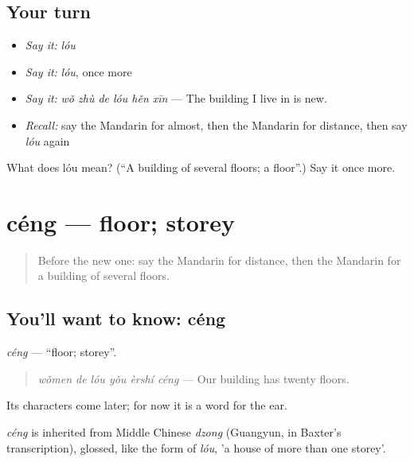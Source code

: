 \subsection*{Your turn}
\begin{itemize}
\raggedright
  \item \emph{Say it:} \emph{lóu}
  \item \emph{Say it:} \emph{lóu}, once more
  \item \emph{Say it:} \emph{wǒ zhù de lóu hěn xīn} — The building I live in is new.
  \item \emph{Recall:} say the Mandarin for almost, then the Mandarin for distance, then say \emph{lóu} again
\end{itemize}

\begin{tcolorbox}[breakable,colback=teal!4,colframe=teal!35!black,title={Before you move on}]
What does lóu mean? (\textquotedblleft{}A building of several floors; a floor\textquotedblright{}.) Say it once more.
\end{tcolorbox}
\section[céng]{céng — floor; storey}

\label{lesson:ZH-C206-ceng}



\begin{quote}
Before the new one: say the Mandarin for distance, then the Mandarin for a building of several floors.
\end{quote}

\subsection*{You'll want to know: céng}
\emph{céng} — \textquotedblleft{}floor; storey\textquotedblright{}.

\begin{quote}
\emph{wǒmen de lóu yǒu èrshí céng} — Our building has twenty floors.
\end{quote}

Its characters come later; for now it is a word for the ear.

\begin{cousinweb}
\emph{céng} is inherited from Middle Chinese \emph{dzong} (Guangyun, in Baxter's transcription), glossed, like the form of \emph{lóu}, 'a house of more than one storey'.
\end{cousinweb}

